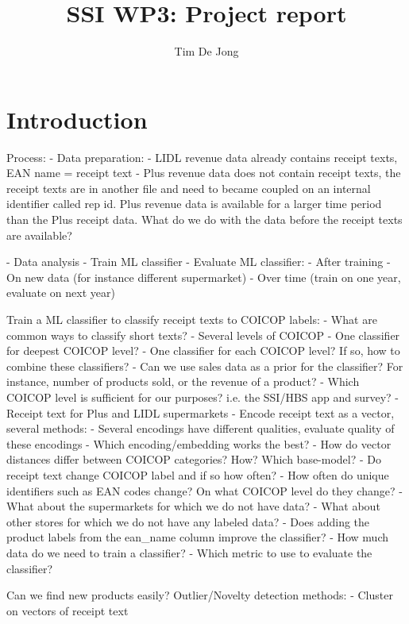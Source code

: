 \documentclass{article}
\title{SSI WP3: Project report}
\author{Tim De Jong}
\begin{document}
\maketitle


\section{Introduction}

Process:
- Data preparation:
    - LIDL revenue data already contains receipt texts, EAN name = receipt text
    - Plus revenue data does not contain receipt texts, the receipt texts are in another file and need to became
    coupled on an internal identifier called rep id. Plus revenue data is available for a larger time period than the
    Plus receipt data. What do we do with the data before the receipt texts are available?

- Data analysis
- Train ML classifier
- Evaluate ML classifier:
    - After training
    - On new data (for instance different supermarket)
    - Over time (train on one year, evaluate on next year)




Train a ML classifier to classify receipt texts to COICOP labels:
- What are common ways to classify short texts?
- Several levels of COICOP
    - One classifier for deepest COICOP level?
    - One classifier for each COICOP level? If so, how to combine these classifiers?
    - Can we use sales data as a prior for the classifier? For instance, number of products sold, 
    or the revenue of a product?
    - Which COICOP level is sufficient for our purposes? i.e. the SSI/HBS app and survey?
- Receipt text for Plus and LIDL supermarkets
- Encode receipt text as a vector, several methods: 
    - Several encodings have different qualities, evaluate quality of these encodings
    - Which encoding/embedding works the best?
    - How do vector distances differ between COICOP categories? How? Which base-model?
- Do receipt text change COICOP label and if so how often?
- How often do unique identifiers such as EAN codes change? On what COICOP level do they change?
- What about the supermarkets for which we do not have data? 
- What about other stores for which we do not have any labeled data?
- Does adding the product labels from the ean\_name column improve the classifier?
- How much data do we need to train a classifier?
- Which metric to use to evaluate the classifier?
    
Can we find new products easily? Outlier/Novelty detection methods:    
    - Cluster on vectors of receipt text
\end{document}
